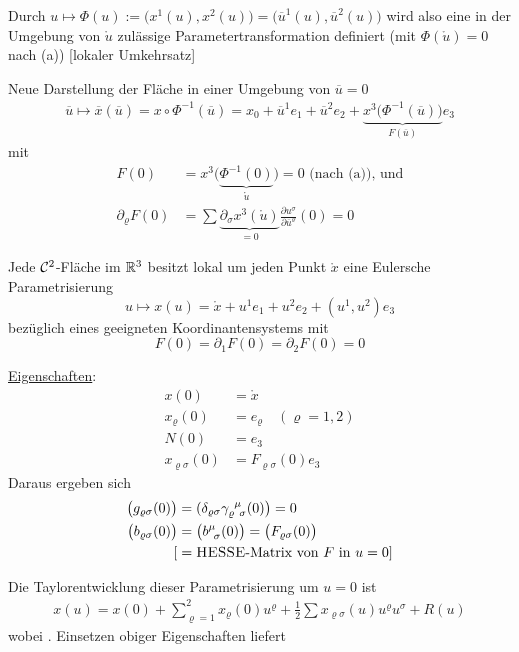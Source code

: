 Durch \(u \mapsto \Phi(u) := \big( x^1(u), x^2(u) \big) = \big(\overline u^1(u), \overline u^2(u)\big)\) wird also eine in der Umgebung von \(\mathring u\) zulässige Parametertransformation definiert (mit \(\Phi\left(\mathring u\right) = 0\) nach (a)) [lokaler Umkehrsatz] \par
Neue Darstellung der Fläche in einer Umgebung von \(\overline u = 0\)
\begin{align*}
 \overline u \mapsto \overline x(\overline u) = x \circ \Phi^{-1} (\overline u) = x_0 + \overline u^1 e_1 + \overline u^2 e_2 + \underbrace{x^3\big(\Phi^{-1}(\overline u)\big)}_{F(\overline u)} e_3
\end{align*}
mit 
\begin{align*} 
F(0) &= x^3\big(\underbrace{\Phi^{-1}(0)}_{\mathring u}\big)= 0 \text{ (nach (a)), und} \\
\partial_\varrho F(0) &= \sum \underbrace{\partial_\sigma x^3\left(\mathring u\right)}_{= 0} \frac{\partial u^\sigma}{\partial \overline u^\varrho}(0) =0
\end{align*}

\begin{hilfssatz}
 Jede \(\mathcal{C}^2\)-Fläche im \(\mathbb{R}^3\) besitzt lokal um jeden Punkt \(\mathring x\) eine Eulersche Parametrisierung 
 \[
  u \mapsto x(u) = \mathring x + u^1 e_1 + u^2 e_2 + (u^1, u^2) e_3
 \]
 bezüglich eines geeigneten Koordinantensystems mit
 \[
  F(0) = \partial_1 F(0) = \partial_2 F(0) = 0
 \]
\end{hilfssatz}

\uline{Eigenschaften}:
\begin{align*}
 x(0) &= \mathring x \\
 x_\varrho(0) &= e_\varrho \quad (\varrho = 1,2) \\
 N(0) &= e_3 \\
 x_{\varrho \sigma}(0) &= F_{\varrho \sigma} (0) e_3
\end{align*}
Daraus ergeben sich
\begin{align*}
 \big(g_{\varrho \sigma}(0)\big) &= (\delta_{\varrho \sigma}  \gamma_{\varrho \;\, \sigma}^{\;\, \mu} (0)\big) = 0\\
 \big(b_{\varrho \sigma}(0)\big) &= \big(b^{\mu}_{\;\, \sigma} (0) \big) = \big(F_{\varrho \sigma} (0) \big) \\ 
 [&= \text{\textsc{HESSE}-Matrix von } F \text{ in } u = 0]
\end{align*}

Die Taylorentwicklung dieser Parametrisierung um \(u = 0\) ist
\begin{align*}
 x(u) = x(0) + \sum_{\varrho = 1}^2 x_\varrho (0) u^\varrho + \frac12 \sum x_{\varrho \sigma}(u) u^\varrho u^\sigma + R(u)
\end{align*}
wobei . Einsetzen obiger Eigenschaften liefert 

